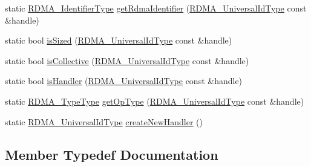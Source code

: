 \begin{DoxyCompactItemize}
\item 
static \hyperlink{namespacevt_1_1rdma_a3b7f2eba1e9063a37d9301061c1432f1}{R\+D\+M\+A\+\_\+\+Identifier\+Type} \hyperlink{structvt_1_1rdma_1_1_handle_manager_ad6f12c5af90a234af9bd717afd523a41}{get\+Rdma\+Identifier} (\hyperlink{structvt_1_1rdma_1_1_handle_manager_acebfe9aa5887a015cc5da18f4f7e55ae}{R\+D\+M\+A\+\_\+\+Universal\+Id\+Type} const \&handle)
\item 
static bool \hyperlink{structvt_1_1rdma_1_1_handle_manager_ab39b12a946cd70fdc18033167187d9a8}{is\+Sized} (\hyperlink{structvt_1_1rdma_1_1_handle_manager_acebfe9aa5887a015cc5da18f4f7e55ae}{R\+D\+M\+A\+\_\+\+Universal\+Id\+Type} const \&handle)
\item 
static bool \hyperlink{structvt_1_1rdma_1_1_handle_manager_a0aa955ef0d6bea53f38eaf82fa428beb}{is\+Collective} (\hyperlink{structvt_1_1rdma_1_1_handle_manager_acebfe9aa5887a015cc5da18f4f7e55ae}{R\+D\+M\+A\+\_\+\+Universal\+Id\+Type} const \&handle)
\item 
static bool \hyperlink{structvt_1_1rdma_1_1_handle_manager_a8e70acc8027b2be6cab2d9e2a165c7f2}{is\+Handler} (\hyperlink{structvt_1_1rdma_1_1_handle_manager_acebfe9aa5887a015cc5da18f4f7e55ae}{R\+D\+M\+A\+\_\+\+Universal\+Id\+Type} const \&handle)
\item 
static \hyperlink{namespacevt_1_1rdma_ac848e1d9da43db6294bd06f83e5d3946}{R\+D\+M\+A\+\_\+\+Type\+Type} \hyperlink{structvt_1_1rdma_1_1_handle_manager_a9587289289345a60a93f7c1de730880c}{get\+Op\+Type} (\hyperlink{structvt_1_1rdma_1_1_handle_manager_acebfe9aa5887a015cc5da18f4f7e55ae}{R\+D\+M\+A\+\_\+\+Universal\+Id\+Type} const \&handle)
\item 
static \hyperlink{structvt_1_1rdma_1_1_handle_manager_acebfe9aa5887a015cc5da18f4f7e55ae}{R\+D\+M\+A\+\_\+\+Universal\+Id\+Type} \hyperlink{structvt_1_1rdma_1_1_handle_manager_ac92a909e182d24b3fd7bcc704260c9fd}{create\+New\+Handler} ()
\end{DoxyCompactItemize}


\subsection{Member Typedef Documentation}
\mbox{\label{structvt_1_1rdma_1_1_handle_manager_a7645bd240d1f95084087f2b01c0d343f}} 
